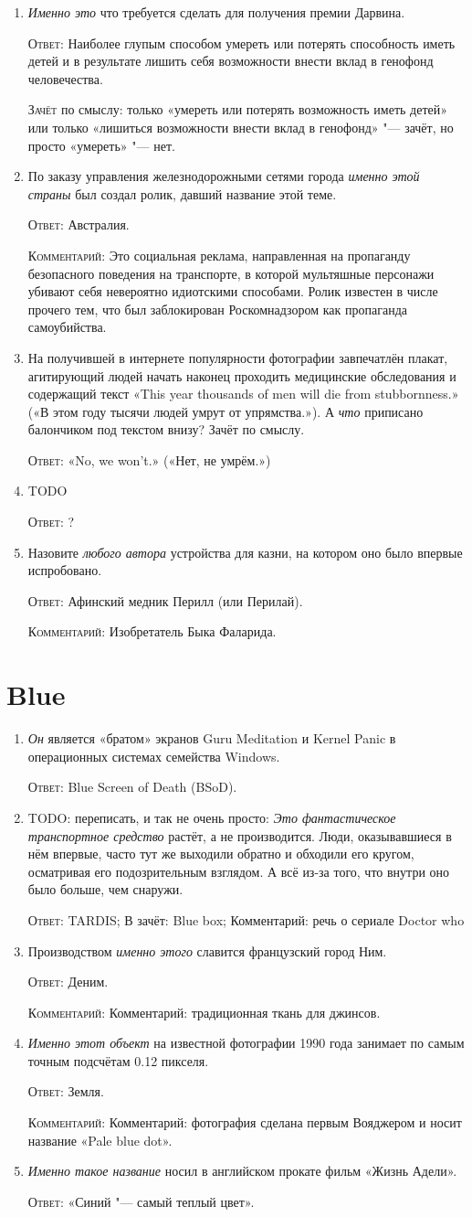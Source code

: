 \documentclass[a4paper,10pt]{article}
\let\keyword\textsc
\newenvironment{topic}{\begin{enumerate}}{\end{enumerate}}
\newcommand{\question}[3]{\item[#1.] #2 \par \keyword{Ответ:} #3}
\newcommand{\commentary}[1]{\par \keyword{Комментарий:} #1}
\newcommand{\criterion}[1]{\par \keyword{Зачёт} #1}
\begin{document}
\begin{topic}
  \question{10}{\emph{Именно это} что требуется сделать для получения премии Дарвина.}{Наиболее глупым способом умереть или потерять способность иметь детей и в результате лишить себя возможности внести вклад в генофонд человечества.}\criterion{по смыслу: только «умереть или потерять возможность иметь детей» или только «лишиться возможности внести вклад в генофонд» "--- зачёт, но просто «умереть» "--- нет.}
  \question{20}{По заказу управления железнодорожными сетями города \emph{именно этой страны} был создал ролик, давший название этой теме.}{Австралия.}\commentary{Это социальная реклама, направленная на пропаганду безопасного поведения на транспорте, в которой мультяшные персонажи убивают себя невероятно идиотскими способами. Ролик известен в числе прочего тем, что был заблокирован Роскомнадзором как пропаганда самоубийства.}
  \question{30}{На получившей в интернете популярности фотографии завпечатлён плакат, агитирующий людей начать наконец проходить медицинские обследования и содержащий текст «This year thousands of men will die from stubbornness.» («В этом году тысячи людей умрут от упрямства.»). А \emph{что} приписано балончиком под текстом внизу? Зачёт по смыслу.}{«No, we won't.» («Нет, не умрём.»)}
  \question{40}{TODO}{?}
  \question{50}{Назовите \emph{любого автора} устройства для казни, на котором оно было впервые испробовано.}{Афинский медник Перилл (или Перилай).}\commentary{Изобретатель Быка Фаларида.}
\end{topic}


\section{Blue}

\begin{topic}
  \question{10}{\emph{Он} является «братом» экранов Guru Meditation и Kernel Panic в операционных системах семейства Windows.}{Blue Screen of Death (BSoD).}
  \question{20}{TODO: переписать, и так не очень просто: \emph{Это фантастическое транспортное средство} растёт, а не производится. Люди, оказывавшиеся в нём впервые, часто тут же выходили обратно и обходили его кругом, осматривая его подозрительным взглядом. А всё из-за того, что внутри оно было больше, чем снаружи.}{TARDIS; В зачёт: Blue box; Комментарий: речь о сериале Doctor who}
  \question{30}{Производством \emph{именно этого} славится французский город Ним.}{Деним.}\commentary{Комментарий: традиционная ткань для джинсов.}
  \question{40}{\emph{Именно этот объект} на известной фотографии 1990 года занимает по самым точным подсчётам 0.12 пикселя.}{Земля.}\commentary{Комментарий: фотография сделана первым Вояджером и носит название «Pale blue dot».}
  \question{50}{\emph{Именно такое название} носил в английском прокате фильм «Жизнь Адели».}{«Синий "--- самый теплый цвет».}
\end{topic}
\end{document}
